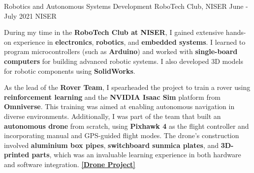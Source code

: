 


\cvevent
    {Robotics and Autonomous Systems Development}  %
    {RoboTech Club, NISER}  %
    {June - July 2021}  %
    {NISER}  %
    \begin{justify}
        During my time in the \textbf{RoboTech Club at NISER}, I gained extensive hands-on experience in \textbf{electronics}, \textbf{robotics}, and \textbf{embedded systems}. I learned to program microcontrollers (such as \textbf{Arduino}) and worked with \textbf{single-board computers} for building advanced robotic systems. I also developed 3D models for robotic components using \textbf{SolidWorks}.  
        
        As the lead of the \textbf{Rover Team}, I spearheaded the project to train a rover using \textbf{reinforcement learning} and the \textbf{NVIDIA Isaac Sim} platform from \textbf{Omniverse}. This training was aimed at enabling autonomous navigation in diverse environments. Additionally, I was part of the team that built an \textbf{autonomous drone} from scratch, using \textbf{Pixhawk 4} as the flight controller and incorporating manual and GPS-guided flight modes. The drone's construction involved \textbf{aluminium box pipes}, \textbf{switchboard sunmica plates}, and \textbf{3D-printed parts}, which was an invaluable learning experience in both hardware and software integration.  
        \href{https://github.com/rtcniser/2022-23_Drone_CONCLUDED}{\textbf{[Drone Project]}}
    \end{justify}


